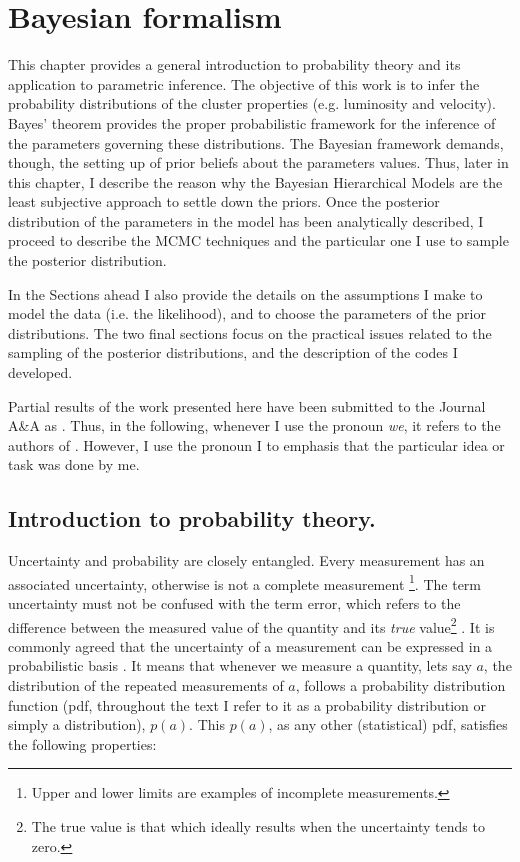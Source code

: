 \chapter{Bayesian formalism}
\label{chap:BHM}
This chapter provides a general introduction to probability theory and its application to parametric inference. The objective of this work is to infer the probability distributions of the cluster properties (e.g. luminosity and velocity). Bayes' theorem provides the proper probabilistic framework for the inference of the parameters governing these distributions. The Bayesian framework demands, though, the setting up of prior beliefs about the parameters values. Thus, later in this chapter, I  describe the reason why the Bayesian Hierarchical Models are the least subjective approach to settle down the priors. Once the posterior distribution of the parameters in the model has been analytically described, I proceed to describe the MCMC techniques and the particular one I use to sample the posterior distribution. 

In the Sections ahead I also provide the details on the assumptions I make to model the data (i.e. the likelihood), and to choose the parameters of the prior distributions. The two final sections focus on the practical issues related to the sampling of the posterior distributions, and the description of the codes I developed.

Partial results of the work presented here have been submitted to the Journal A\&A as \citet{Olivares2017}. Thus, in the following, whenever I use the pronoun \emph{we}, it refers to the authors of \citet{Olivares2017}. However, I use the pronoun I to emphasis that the particular idea or task was done by me.

\section{Introduction to probability theory.}
 
Uncertainty and probability are closely entangled. Every measurement has an associated uncertainty, otherwise is not a complete measurement \footnote{Upper and lower limits are examples of incomplete measurements.}. The term uncertainty must not be confused with the term error, which refers to the difference between the measured value of the quantity and its \emph{true} value\footnote{The true value is that which ideally results when the uncertainty tends to zero.} \citep{GUM2008}. It is commonly agreed that the uncertainty of a measurement can be expressed in a probabilistic basis \citep{GUM2008}. It means that whenever we measure a quantity, lets say $a$, the distribution of the repeated measurements of $a$, follows a probability distribution function (pdf, throughout the text I refer to it as a probability distribution or simply a distribution), $p(a)$. This $p(a)$, as any other (statistical) pdf,  satisfies the following properties:

